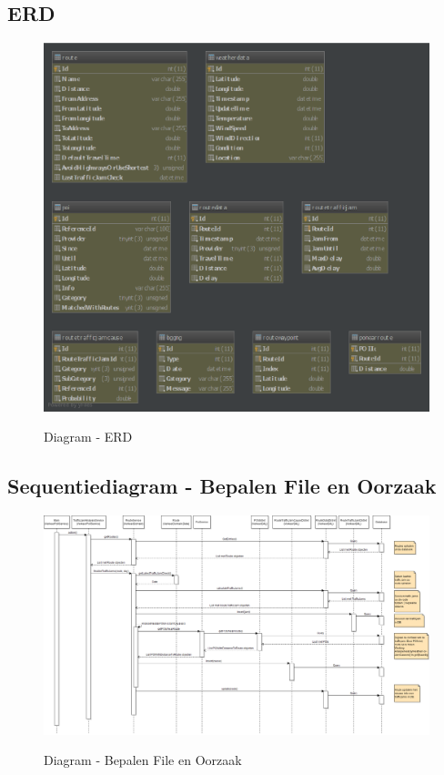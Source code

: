 \documentclass[a4paper]{article}
\begin{document}
\newpage

\subsection{ERD}


\begin{figure}[H]
\centering
\includegraphics[width=\textwidth]{images/erd.eps}\\
\caption{Diagram - ERD}
\end{figure}


\subsection{Sequentiediagram - Bepalen File en Oorzaak}

\begin{figure}[H]
\centering
\includegraphics[angle=90, scale=0.34]{images/TrafficJamAnalysis.png}\\
\caption{Diagram - Bepalen File en Oorzaak}
\end{figure}
\end{document}
